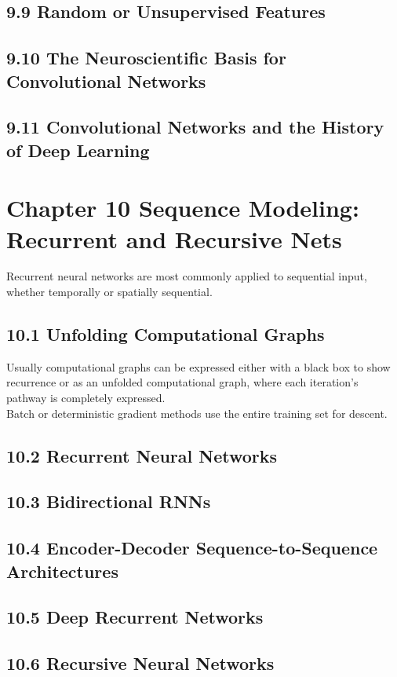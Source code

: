 \documentclass[a4paper]{report}
\begin{document}
\subsection{9.9 Random or Unsupervised Features}

\subsection{9.10 The Neuroscientific Basis for Convolutional Networks}

\subsection{9.11 Convolutional Networks and the History of Deep Learning}


\section{Chapter 10 Sequence Modeling: Recurrent and Recursive Nets}
Recurrent neural networks are most commonly applied to sequential input, whether temporally or spatially sequential.

\subsection{10.1 Unfolding Computational Graphs}
Usually computational graphs can be expressed either with a black box to show recurrence or as an unfolded computational graph, where each iteration's pathway is completely expressed.\\
Batch or deterministic gradient methods use the entire training set for descent.

\subsection{10.2 Recurrent Neural Networks}
\subsection{10.3 Bidirectional RNNs}
\subsection{10.4 Encoder-Decoder Sequence-to-Sequence Architectures}
\subsection{10.5 Deep Recurrent Networks}
\subsection{10.6 Recursive Neural Networks}
\end{document}
